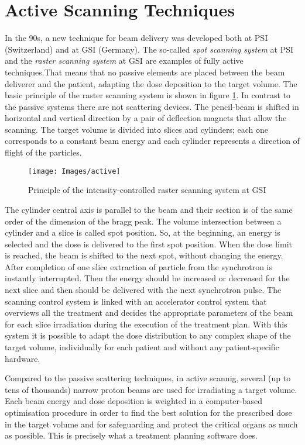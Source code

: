 \documentclass[12pt, a4paper, twoside]{book}
\begin{document}
\section{Active Scanning Techniques}
\label{activeScanning}
In the 90s, a new technique for beam delivery was developed both at PSI (Switzerland) and at GSI (Germany). The so-called \emph{spot scanning system} at PSI and the \emph{raster scanning system} at GSI are examples of  fully active techniques.That means that no passive elements are placed between the beam deliverer and the patient, adapting the dose deposition to the target volume. The basic principle of the raster scanning system is shown in figure \ref{fig:active}.
In contrast to the passive systems there are not scattering devices. The pencil-beam is shifted in horizontal and vertical direction by a pair of deflection magnets that allow the scanning. The target volume is divided into slices and cylinders; each one corresponds to a constant beam energy and each cylinder represents a direction of flight of the particles.
\begin{figure}[!b]
{\texttt{[image: Images/active]}}
\caption{Principle of the intensity-controlled raster scanning system at GSI \cite{hab:scan}}
\label{fig:active}
\end{figure}
The cylinder central axis is parallel to the beam and their section is of the same order of the dimension of the bragg peak. The volume intersection between a cylinder and a slice is called spot position.
So, at the beginning, an energy is selected and the dose is delivered to the first spot position.
When the dose limit is reached, the beam is shifted to the next spot, without changing the energy. After completion of one slice extraction of particle from the synchrotron is instantly interrupted. Then the energy should be increased or decreased for the next slice and then should be delivered with the next synchrotron pulse. The scanning control system is linked with an accelerator control system that overviews all the treatment and decides the appropriate parameters of the beam for each slice irradiation during the execution of the treatment plan. 
With this system it is possible to adapt the dose distribution to any complex shape of the target volume, individually for each patient and without any patient-specific hardware.

Compared to the passive scattering techniques, in active scannig, several (up to tens of thousands) narrow proton beams are used for irradiating a target volume. Each beam energy and dose deposition is weighted in a computer-based optimisation procedure in order to find the best solution for the prescribed dose in the target volume and for safeguarding and protect the critical organs as much as possible.
This is precisely what a treatment planning software does.
\end{document}
